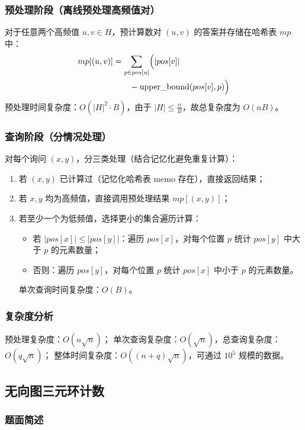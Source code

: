 \documentclass[11pt,a4paper,twocolumn]{ctexart}  %
\begin{document}
\subsubsection*{预处理阶段（离线预处理高频值对）}
对于任意两个高频值 $u, v \in H$，预计算数对 $(u,v)$ 的答案并存储在哈希表 $mp$ 中：
\[
\begin{aligned}
mp[(u,v)] &= \sum_{p \in pos[u]} \Bigl( |pos[v]| \\
           &\qquad - \text{upper\_bound}(pos[v], p) \Bigr)
\end{aligned}
\]
预处理时间复杂度：$O(|H|^2 \cdot B)$，由于 $|H| \le \frac{n}{B}$，故总复杂度为 $O(nB)$。

\subsubsection*{查询阶段（分情况处理）}
对每个询问 $(x,y)$，分三类处理（结合记忆化避免重复计算）：
\begin{enumerate}
    \item 若 $(x,y)$ 已计算过（记忆化哈希表 $\text{memo}$ 存在），直接返回结果；
    \item 若 $x,y$ 均为高频值，直接调用预处理结果 $mp[(x,y)]$；
    \item 若至少一个为低频值，选择更小的集合遍历计算：
          \begin{itemize}
              \item 若 $|pos[x]| \le |pos[y]|$：遍历 $pos[x]$，对每个位置 $p$ 统计 $pos[y]$ 中大于 $p$ 的元素数量；
              \item 否则：遍历 $pos[y]$，对每个位置 $p$ 统计 $pos[x]$ 中小于 $p$ 的元素数量。
          \end{itemize}
          单次查询时间复杂度：$O(B)$。
\end{enumerate}

\subsubsection*{复杂度分析}
预处理复杂度：$O(n\sqrt{n})$；
单次查询复杂度：$O(\sqrt{n})$，总查询复杂度：$O(q\sqrt{n})$；
整体时间复杂度：$O((n+q)\sqrt{n})$，可通过 $10^5$ 规模的数据。



\subsection{无向图三元环计数}
\subsubsection*{题面简述}
\end{document}
